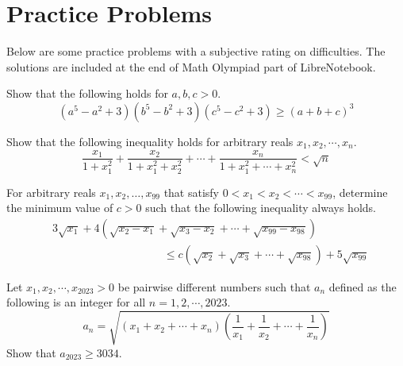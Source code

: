\documentclass[../../../main.tex]{subfiles}
\begin{document}
\section{Practice Problems}\label{sec:26hlggx}

Below are some practice problems with a subjective rating on
difficulties. The solutions are included at the end of Math Olympiad
part of LibreNotebook.

\begin{listproblem}
Show that the following holds for $a, b, c > 0$.
\[
(a^5 - a^2 + 3)(b^5 - b^2 + 3)(c^5 - c^2 + 3)
\geq (a + b + c)^3
\]
\end{listproblem}

\begin{listproblem}
Show that the following inequality holds for arbitrary reals
$x_1, x_2, \cdots, x_n$.
\[
\frac{x_1}{1 + x_1^2} + \frac{x_2}{1 + x_1^2 + x_2^2} +
    \cdots + \frac{x_n}{1+ x_1^2  + \cdots + x_n^2}
< \sqrt{n}
\]
\end{listproblem}

\begin{listproblem}
For arbitrary reals $x_1, x_2, \dots, x_{99}$ that satisfy
$0 < x_1 < x_2 < \cdots < x_{99}$, determine the minimum value of
$c > 0$ such that the following inequality always holds.
\begin{align*}
    &3\sqrt{x_1} + 4 \left( \sqrt{x_2 - x_1} + \sqrt{x_3 - x_2} +
        \cdots + \sqrt{x_{99} - x_{98}}
    \right) \\
    &\qquad\qquad\qquad\qquad\qquad
    \leq c \left(
        \sqrt{x_2} + \sqrt{x_3} + \cdots + \sqrt{x_{98}}
    \right) + 5\sqrt{x_{99}}
\end{align*}
\end{listproblem}

\begin{listproblem}
Let $x_1, x_2, \cdots , x_{2023} > 0$ be pairwise different numbers
such that $a_n$ defined as the following is an integer for all
$n = 1, 2, \cdots, 2023$.
\[
a_n
= \sqrt{ \left( x_1 + x_2 + \cdots + x_n \right) \left( \frac{1}{x_1}
    + \frac{1}{x_2} + \cdots + \frac{1}{x_n} \right)
}
\] 
Show that $a_{2023} \geq 3034$.
\end{listproblem}
\end{document}
